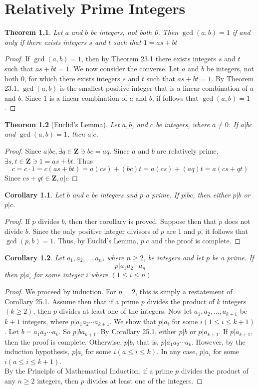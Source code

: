 \documentclass[10pt]{report}
\newtheorem{thm1}{Theorem}[chapter]
\newtheorem{cor1}{Corollary}[chapter]
\begin{document}
\chapter{Relatively Prime Integers}
\begin{thm1}
Let $a$ and $b$ be integers, not both 0. Then $\gcd(a,b)=1$ if and only if there exists integers $s$ and $t$ such that $1=as+bt$
\end{thm1}
\begin{proof}
If $\gcd(a,b) = 1$, then by Theorem 23.1 there exists integers $s$ and $t$ such that $as+bt=1$. We now consider the converse. Let $a$ and $b$ be integers, not both 0, for which there exists integers $s$ and $t$ such that $as+bt=1$. By Theorem 23.1, $\gcd(a,b)$ is the smallest positive integer that is a linear combination of $a$ and $b$. Since 1 is a linear combination of $a$ and $b$, if follows that $\gcd(a,b)=1$.
\end{proof}
\begin{thm1}[Euclid's Lemma]
Let $a, b$, and $c$ be integers, where $a\neq 0$. If $a|bc$ and $\gcd(a, b)=1$, then $a|c$.
\end{thm1}
\begin{proof}
Since $a|bc,\exists q\in \textbf{Z}\ni bc=aq$. Since $a$ and $b$ are relatively prime, $\exists s,t\in \textbf{Z} \ni 1=as+bt$. Thus
$$c = c\cdot 1 = c(as+bt) = a(cs)+(bc)t = a(cs)+(aq)t = a(cs+qt)$$ 
Since $cs+qt\in \textbf{Z},a|c$
\end{proof}
\begin{cor1}
Let $b$ and $c$ be integers and $p$ a prime. If $p|bc$, then either $p|b$ or $p|c$.
\end{cor1}
\begin{proof}
If $p$ divides $b$, then ther corollary is proved. Suppose then that $p$ does not divide $b$. Since the only positive integer divisors of $p$ are 1 and $p$, it follows that $\gcd(p,b)=1$. Thus, by Euclid's Lemma, $p|c$ and the proof is complete.
\end{proof}
\begin{cor1}
Let $a_1, a_2, \dots , a_n$, where $n\geq 2$, be integers and let $p$ be a prime. If
$$p|a_1a_2\cdots a_n$$
then $p|a_i$ for some integer $i$ where $(1\leq i \leq n)$
\end{cor1}
\begin{proof}
We proceed by induction. For $n=2$, this is simply a restatement of Corollary 25.1. Assume then that if a prime $p$ divides the product of $k$ integers $(k\geq 2)$, then $p$ divides at least one of the integers. Now let $a_1,a_2,...,a_{k+1}$ be $k+1$ integers, where $p|a_1a_2\cdots a_{k+1}$. We show that $p|a_i$ for some $i (1\leq i \leq k+1)$. Let $b=a_1a_2\cdots a_k$. So $p|ba_{k+1}$. By Corollary 25.1, either $p|b$ or $p|a_{k+1}$. If $p|a_{k+1}$, then the proof is complete. Otherwise, $p|b$, that is, $p|a_1a_2\cdots a_k$. However, by the induction hypothesis, $p|a_i$ for some $i (a\leq i \leq k)$. In any case, $p|a_i$ for some $i (a\leq i \leq k+1)$.\\
By the Principle of Mathematical Induction, if a prime $p$ divides the product of any $n\geq 2$ integers, then $p$ divides at least one of the integers.
\end{proof}
\end{document}
